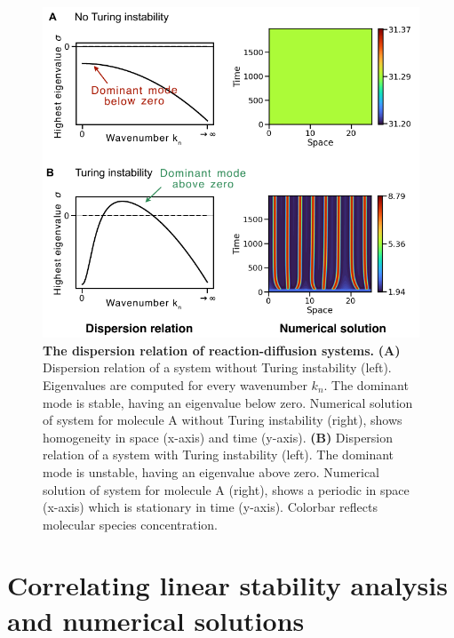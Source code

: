 \begin{figure}[H] %
    \centering
    \includegraphics[width=01\textwidth]{chapters/Chapter 1/turing_vs_noturing} %
    \caption{\textbf{The dispersion relation of reaction-diffusion systems.} \textbf{(A)} Dispersion relation of a system without Turing instability (left). Eigenvalues are computed for every wavenumber $k_{n}$. The dominant mode is stable, having an eigenvalue below zero. Numerical solution of system for molecule A without Turing instability (right), shows homogeneity in space (x-axis) and time (y-axis).  \textbf{(B)} Dispersion relation of a system with Turing instability (left). The dominant mode is unstable, having an eigenvalue above zero. Numerical solution of system for molecule A (right), shows a periodic in space (x-axis) which is stationary in time (y-axis). Colorbar reflects molecular species concentration.}
    \label{fig:turing_vs_noturing} %
\end{figure}

\section{Correlating linear stability analysis and numerical solutions}
